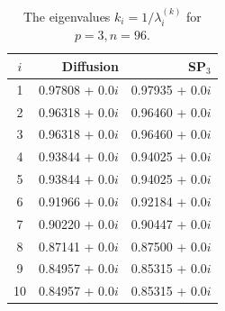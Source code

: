 \documentclass[authoryear]{elsarticle}
\begin{document}
\begin{table}[htp]
\caption{The eigenvalues $k_i=1/\lambda_i^{(k)}$ for $p=3, n=96$.}
\label{tab:iaea_without_lambda_10}
\begin{center}
\begin{tabular}{c r r}
\hline
$i$ & Diffusion & SP$_3$  \\
\hline
1 & 0.97808 + 0.0$i$ & 0.97935 + 0.0$i$\\
2 & 0.96318 + 0.0$i$ & 0.96460 + 0.0$i$\\
3 & 0.96318 + 0.0$i$ & 0.96460 + 0.0$i$\\
4 & 0.93844 + 0.0$i$ & 0.94025 + 0.0$i$\\
5 & 0.93844 + 0.0$i$ & 0.94025 + 0.0$i$\\
6 & 0.91966 + 0.0$i$ & 0.92184 + 0.0$i$\\
7 & 0.90220 + 0.0$i$ & 0.90447 + 0.0$i$\\
8 & 0.87141 + 0.0$i$ & 0.87500 + 0.0$i$\\
9 & 0.84957 + 0.0$i$ & 0.85315 + 0.0$i$\\
10 & 0.84957 + 0.0$i$ & 0.85315 + 0.0$i$\\
\hline
\end{tabular}
\end{center}
\end{table}
\end{document}
